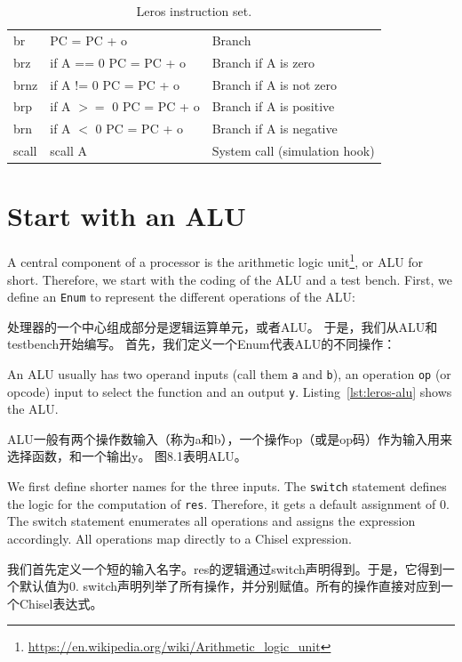 \documentclass[%
    10pt,
    headinclude, footexclude,
    openright, %
    notitlepage,
    cleardoubleempty,
    headsepline,
    pointlessnumbers,
    bibtotoc, idxtotoc,
    ]{scrbook}
\newcommand{\code}[1]{{\small{\texttt{#1}}}}
\newcommand{\todo}[1]{{\emph{TODO: #1}}}
\newcommand{\myref}[2]{\href{#1}{#2}}
\renewcommand{\myref}[2]{{#2}{\footnote{\url{#1}}}}
\renewcommand{\todo}[1]{}
\begin{document}
\begin{table}
\begin{tabular}{lll}
br & PC = PC + o & Branch \\
brz & if A == 0 PC = PC + o & Branch if A is zero \\
brnz & if A != 0 PC = PC + o  & Branch if A is not zero \\
brp & if A $>=$ 0 PC = PC + o & Branch if A is positive \\
brn & if A $<$ 0 PC = PC + o & Branch if A is negative \\
scall & scall A & System call (simulation hook) \\
\bottomrule
\end{tabular}
\caption{Leros instruction set.}
\label{tab:leros:isa}
\end{table}

\section{Start with an ALU}

A central component of a processor is the
\myref{https://en.wikipedia.org/wiki/Arithmetic_logic_unit}{arithmetic logic unit}, or ALU for short.
Therefore, we start with the coding of the ALU and a test bench.
First, we define an \code{Enum} to represent the different operations of the ALU:

处理器的一个中心组成部分是逻辑运算单元，或者ALU。
于是，我们从ALU和testbench开始编写。
首先，我们定义一个Enum代表ALU的不同操作：


\noindent An ALU usually has two operand inputs (call them \code{a} and \code{b}), an operation \code{op}
(or opcode) input to select the function and an output \code{y}.
Listing~\ref{lst:leros-alu} shows the ALU.

ALU一般有两个操作数输入（称为a和b），一个操作op（或是op码）作为输入用来选择函数，和一个输出y。
图8.1表明ALU。

\todo{draw a nice ALU, see Wikipedia}

We first define shorter names for the three inputs. The \code{switch} statement defines the
logic for the computation of \code{res}. Therefore, it gets a default assignment of 0.
The switch statement enumerates all operations and assigns the expression accordingly.
All operations map directly to a Chisel expression.

我们首先定义一个短的输入名字。res的逻辑通过switch声明得到。于是，它得到一个默认值为0.
switch声明列举了所有操作，并分别赋值。所有的操作直接对应到一个Chisel表达式。
\end{document}
